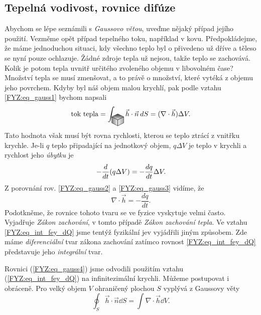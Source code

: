     \subsection{Tepelná vodivost, rovnice difúze}
      Abychom se lépe seznámili s \emph{Gaussovo větou}, uveďme nějaký případ jejího použití. 
      Vezměme opět případ tepelného toku, například v kovu. Předpokládejme, že máme jednoduchou 
      situaci, kdy všechno teplo byl o přivedeno už dříve a těleso se nyní pouze ochlazuje. Žádné 
      zdroje tepla už nejsou, takže teplo se zachovává. Kolik je potom tepla uvnitř určitého 
      zvoleného objemu v libovolném čase? Množství tepla se musí zmenšovat, a to právě o množství, 
      které vytéká z objemu jeho povrchem. Kdyby byl náš objem malou krychlí, pak podle vztahu
      \ref{FYZ:eq_gauss1} bychom napsali
      \begin{equation}\label{FYZ:eq_gauss2}
       \text{tok tepla}=\int_{\cube}\vec{h}\cdot\vec{n}\dd{S} = (\nabla\cdot\vec{h})\Delta V.
      \end{equation}
      Tato hodnota však musí být rovna rychlosti, kterou se teplo ztrácí z vnitřku krychle. Je-li $q$
      teplo připadající na jednotkový objem, $q\Delta V$ je teplo v krychli a rychlost jeho
      \emph{úbytku} je
      \begin{equation}\label{FYZ:eq_gauss3}
       - \frac{d  }{d t}(q\Delta V) = - \frac{d q}{d t}\Delta V.
      \end{equation}
      Z porovnání rov. \ref{FYZ:eq_gauss2} a \ref{FYZ:eq_gauss3} vidíme, že 
      \begin{equation}\label{FYZ:eq_gauss4}
        \nabla\cdot\vec{h} = - \frac{dq}{dt}. 
      \end{equation}
      Podotkněme, že rovnice tohoto tvaru se ve fyzice vyskytuje velmi často. Vyjadřuje \emph{Zákon 
      zachování}, v tomto případě \emph{Zákon zachování tepla}. Ve vztahu \ref{FYZ:eq_int_fey_dQ} 
      jsme tentýž fyzikální jev vyjádřili jiným způsobem. Zde máme \emph{diferenciální} tvar zákona 
      zachování zatímco rovnost \ref{FYZ:eq_int_fey_dQ} představuje jeho \emph{integrální} tvar.
      
      Rovnici (\ref{FYZ:eq_gauss4}) jsme odvodili použitím vztahu (\ref{FYZ:eq_int_fey_dQ}) na 
      infinitezimální krychli. Můžeme postupovat i obráceně. Pro velký objem \(V\) ohraničený plochou \(S\) 
      vyplývá z Gaussovy věty
      \begin{equation}\label{FYZ:eq_gauss5}
        \oint_S\vec{h}\cdot\vec{n}\dd{S} = \int\nabla\cdot\vec{h}\dd{V}.
      \end{equation}
      
